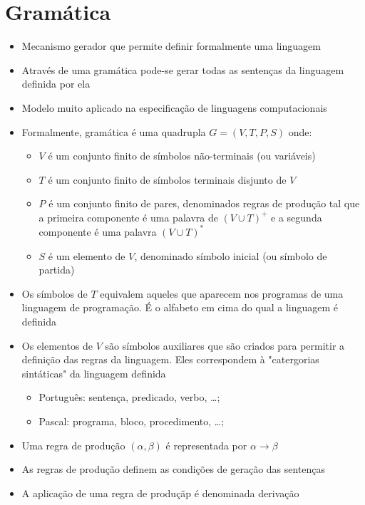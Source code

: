 \documentclass[12pt]{article}
\begin{document}
\section{Gramática}
\begin{itemize}
    \item Mecanismo gerador que permite definir formalmente uma linguagem
    \item Através de uma gramática pode-se gerar todas as sentenças da linguagem 
    definida por ela
    \item Modelo muito aplicado na especificação de linguagens computacionais
    \item Formalmente, gramática é uma quadrupla $G = (V,T,P,S)$ onde:
    \begin{itemize}
        \item $V$ é um conjunto finito de símbolos não-terminais (ou variáveis)
        \item $T$ é um conjunto finito de símbolos terminais disjunto de $V$
        \item $P$ é um conjunto finito de pares, denominados regras de produção 
        tal que a primeira componente é uma palavra de $(V\cup T)^+$ e a segunda 
        componente é uma palavra $(V\cup T)^*$
        \item $S$ é um elemento de $V$, denominado símbolo inicial (ou símbolo 
        de partida)
    \end{itemize}
    \item Os símbolos de $T$ equivalem aqueles que aparecem nos programas de 
    uma linguagem de programação. É o alfabeto em cima do qual a linguagem é 
    definida 
    \item Os elementos de $V$ são símbolos auxiliares que são criados para 
    permitir a definição das regras da linguagem. Eles correspondem à 
    "catergorias sintáticas" da linguagem definida
    \begin{itemize}
        \item Português: sentença, predicado, verbo, \ldots;
        \item Pascal: programa, bloco, procedimento, \ldots;
    \end{itemize}
    \item Uma regra de produção $(\alpha, \beta)$ é representada por $\alpha 
    \rightarrow \beta$ 
    \item As regras de produção definem as condições de geração das sentenças
    \item A aplicação de uma regra de produçãp é denominada derivação

\end{itemize}
\end{document}
